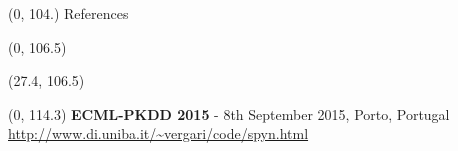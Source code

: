 \documentclass[final]{beamer}
\begin{document}
\begin{frame}{}
  
  
  \begin{textblock}{80}(0, 104.)
    References
  \end{textblock}
  

  \begin{textblock}{52}(0, 106.5)
    \small
    \setlength\bibitemsep{8pt}
    \printbibliography
  \end{textblock}
  
  \begin{textblock}{25.2}(27.4, 106.5)
    \small
  \end{textblock}
  

  \begin{textblock}{80}(0, 114.3)
    \footnotesize
    \textbf{ECML-PKDD 2015} - 8th September 2015, Porto, Portugal\hfill
    {\url{http://www.di.uniba.it/~vergari/code/spyn.html}}
  \end{textblock}
  
\end{frame}
\end{document}
